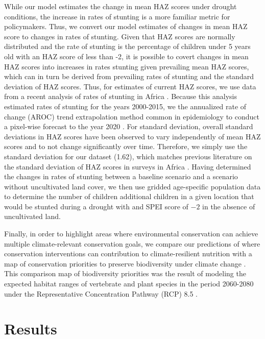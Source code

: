 \documentclass{article}
\begin{document}
While our model estimates the change in mean HAZ scores under drought conditions, the increase in rates of stunting is a more familiar metric for policymakers.  Thus, we convert our model estimates of changes in mean HAZ score to changes in rates of stunting. Given that HAZ scores are normally distributed and the rate of stunting is the percentage of children under 5 years old with an HAZ score of less than -2, it is possible to covert changes in mean HAZ scores into increases in rates stunting given prevailing mean HAZ scores, which can in turn be derived from prevailing rates of stunting and the standard deviation of HAZ scores.  Thus, for estimates of current HAZ scores, we use data from a recent analysis of rates of stunting in Africa \cite{Osgood-Zimmerman2018}.  Because this analysis estimated rates of stunting for the years 2000-2015, we the annualized rate of change (AROC) trend extrapolation method common in epidemiology to conduct a pixel-wise forecast to the year 2020 \cite{Fullman2017, Osgood-Zimmerman2018}.  For standard deviation, overall standard deviations in HAZ scores have been observed to vary independently of mean HAZ scores \cite{Mei2007} and to not change significantly over time.  Therefore, we simply use the standard deviation for our dataset (1.62), which matches previous literature on the standard deviation of HAZ scores in surveys in Africa \cite{Mei2007}.  Having determined the changes in rates of stunting between a baseline scenario and a scenario without uncultivated land cover, we then use gridded age-specific population data \cite{Tatem2017} to determine the number of children additional children in a given location that would be stunted during a drought with and SPEI score of $-2$ in the absence of uncultivated land.

Finally, in order to highlight areas where environmental conservation can achieve multiple climate-relevant conservation goals, we compare our predictions of where conservation interventions can contribution to climate-resilient nutrition with a map of conservation priorities to preserve biodiversity under climate change \cite{hannah2020}.  This comparison map of biodiversity priorities was the result of modeling the expected habitat ranges of vertebrate and plant species in the period 2060-2080 under the Representative Concentration Pathway (RCP) 8.5 \cite{hannah2020}.

\section{Results}
\end{document}
